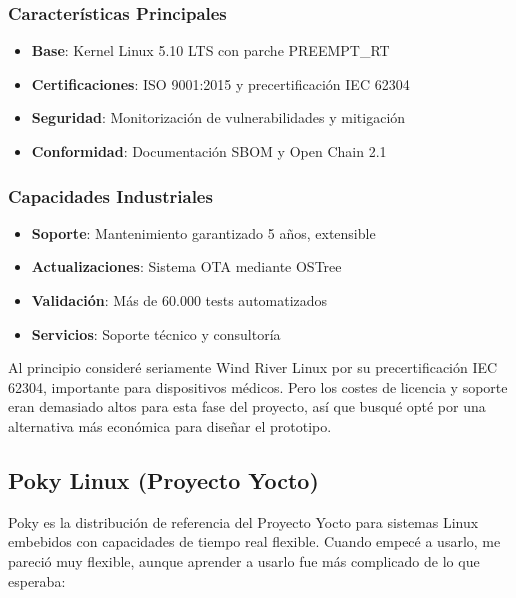         \subsubsection{Características Principales}
            \begin{itemize}
                \item \textbf{Base}: Kernel Linux 5.10 LTS con parche PREEMPT\_RT
                \item \textbf{Certificaciones}: ISO 9001:2015 y precertificación IEC 62304
                \item \textbf{Seguridad}: Monitorización de vulnerabilidades y mitigación
                \item \textbf{Conformidad}: Documentación SBOM y Open Chain 2.1
            \end{itemize}

        \subsubsection{Capacidades Industriales}
            \begin{itemize}
                \item \textbf{Soporte}: Mantenimiento garantizado 5 años, extensible
                \item \textbf{Actualizaciones}: Sistema OTA mediante OSTree
                \item \textbf{Validación}: Más de 60.000 tests automatizados
                \item \textbf{Servicios}: Soporte técnico y consultoría
            \end{itemize}

        Al principio consideré seriamente Wind River Linux por su precertificación IEC 62304, importante para dispositivos médicos. Pero los costes de licencia y soporte eran demasiado altos para esta fase del proyecto, así que busqué opté por una alternativa más económica para diseñar el prototipo.

    \newpage
    \subsection{Poky Linux (Proyecto Yocto)}
        Poky es la distribución de referencia del Proyecto Yocto para sistemas Linux embebidos con capacidades de tiempo real flexible. Cuando empecé a usarlo, me pareció muy flexible, aunque aprender a usarlo fue más complicado de lo que esperaba:

